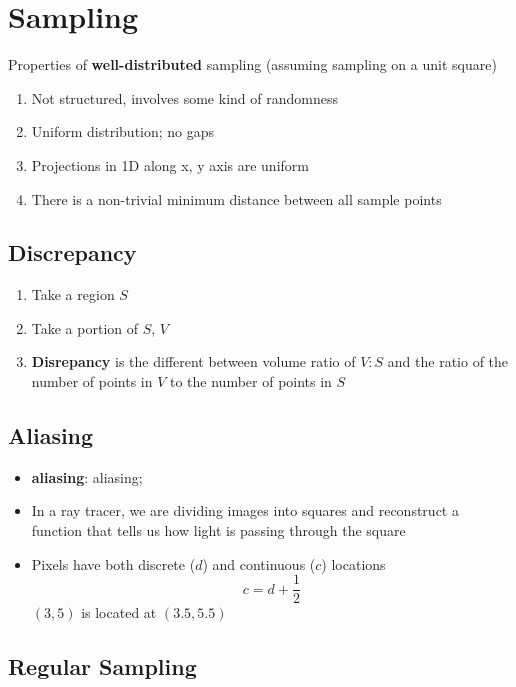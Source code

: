 \chapter{Sampling}

Properties of \textbf{well-distributed} sampling (assuming sampling on
a unit square)
\begin{enumerate}
  \item Not structured, involves some kind of randomness
  \item Uniform distribution; no gaps
  \item Projections in 1D along x, y axis are uniform
  \item There is a non-trivial minimum distance between all sample points
\end{enumerate}

\section{Discrepancy}

  \begin{enumerate}
    \item Take a region $ S $
    \item Take a portion of $ S $, $ V $
    \item \textbf{Disrepancy} is the different between volume ratio of $ V:S $
    and the ratio of the number of points in $ V $ to the number of points in
    $ S $
  \end{enumerate}

\section{Aliasing}

  \begin{itemize}
    \item \textbf{\Gls{aliasing}}: \Glsdesc{aliasing};
    \item In a ray tracer, we are dividing images into squares and reconstruct
    a function that tells us how light is passing through the square
    \item Pixels have both discrete ($ d $) and continuous ($ c $) locations
    \begin{equation}
      c = d + \frac{1}{2}
    \end{equation}
    $ \left( 3, 5 \right) $ is located at $ \left( 3.5, 5.5 \right) $
  \end{itemize}

\section{Regular Sampling}

